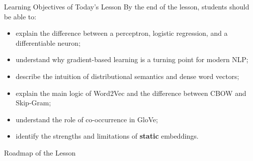 \documentclass[11pt,aspectratio=169,professionalfonts]{beamer}
\begin{document}
%
%
\begin{frame}{Learning Objectives of Today's Lesson}
By the end of the lesson, students should be able to:
\begin{itemize}
    \item explain the difference between a perceptron, logistic regression, and a differentiable neuron;
    \item understand why gradient-based learning is a turning point for modern NLP;
    \item describe the intuition of distributional semantics and dense word vectors;
    \item explain the main logic of Word2Vec and the difference between CBOW and Skip-Gram;
    \item understand the role of co-occurrence in GloVe;
    \item identify the strengths and limitations of \textbf{static} embeddings.
\end{itemize}
\end{frame}
%
%
\begin{frame}{Roadmap of the Lesson}
\tableofcontents
\end{frame}
%
\end{document}
